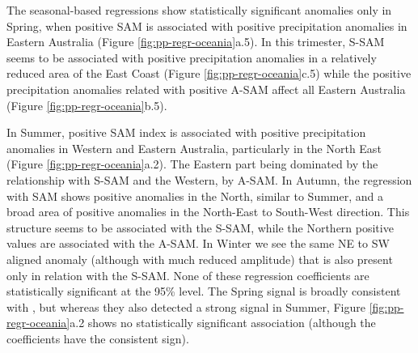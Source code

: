 \documentclass[smallextended]{svjour3}       %
\begin{document}
The seasonal-based regressions show statistically significant anomalies only in Spring, when positive SAM is associated with positive precipitation anomalies in Eastern Australia (Figure \ref{fig:pp-regr-oceania}a.5).
In this trimester, S\nobreakdash-SAM seems to be associated with positive precipitation anomalies in a relatively reduced area of the East Coast (Figure \ref{fig:pp-regr-oceania}c.5) while the positive precipitation anomalies related with positive A\nobreakdash-SAM affect all Eastern Australia (Figure \ref{fig:pp-regr-oceania}b.5).

In Summer, positive SAM index is associated with positive precipitation anomalies in Western and Eastern Australia, particularly in the North East (Figure \ref{fig:pp-regr-oceania}a.2).
The Eastern part being dominated by the relationship with S\nobreakdash-SAM and the Western, by A\nobreakdash-SAM.
In Autumn, the regression with SAM shows positive anomalies in the North, similar to Summer, and a broad area of positive anomalies in the North-East to South-West direction.
This structure seems to be associated with the S\nobreakdash-SAM, while the Northern positive values are associated with the A\nobreakdash-SAM.
In Winter we see the same NE to SW aligned anomaly (although with much reduced amplitude) that is also present only in relation with the S\nobreakdash-SAM.
None of these regression coefficients are statistically significant at the 95\% level.
The Spring signal is broadly consistent with \citet{hendon2007}, but whereas they also detected a strong signal in Summer, Figure \ref{fig:pp-regr-oceania}a.2 shows no statistically significant association (although the coefficients have the consistent sign).
\end{document}
